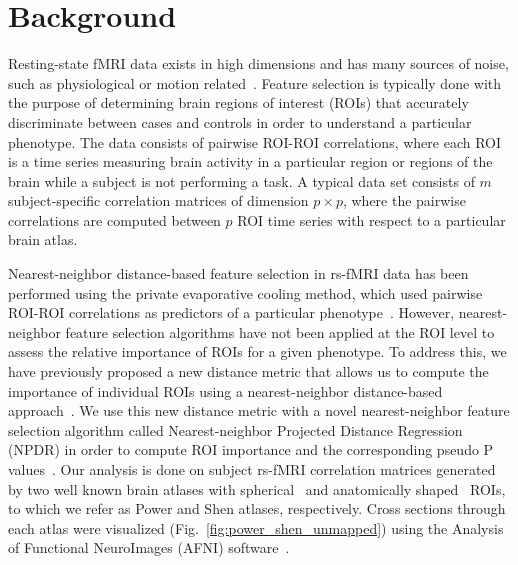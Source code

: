 \documentclass[10pt,letterpaper]{article}\usepackage[]{graphicx}\usepackage[]{color}
\begin{document}
\section{Background}
Resting-state fMRI data exists in high dimensions and has many sources of noise, such as physiological or motion related~\cite{caballero2017}. Feature selection is typically done with the purpose of determining brain regions of interest (ROIs) that accurately discriminate between cases and controls in order to understand a particular phenotype. The data consists of pairwise ROI-ROI correlations, where each ROI is a time series measuring brain activity in a particular region or regions of the brain while a subject is not performing a task. A typical data set consists of $m$ subject-specific correlation matrices of dimension $p \times p$, where the pairwise correlations are computed between $p$ ROI time series with respect to a particular brain atlas. 

Nearest-neighbor distance-based feature selection in rs-fMRI data has been performed using the private evaporative cooling method, which used pairwise ROI-ROI correlations as predictors of a particular phenotype~\cite{le17}. However, nearest-neighbor feature selection algorithms have not been applied at the ROI level to assess the relative importance of ROIs for a given phenotype. To address this, we have previously proposed a new distance metric that allows us to compute the importance of individual ROIs using a nearest-neighbor distance-based approach~\cite{dawkins2019}. We use this new distance metric with a novel nearest-neighbor feature selection algorithm called Nearest-neighbor Projected Distance Regression (NPDR) in order to compute ROI importance and the corresponding pseudo P values~\cite{npdr}. Our analysis is done on subject rs-fMRI correlation matrices generated by two well known brain atlases with spherical~\cite{power2011} and anatomically shaped~\cite{shen2013} ROIs, to which we refer as Power and Shen atlases, respectively. Cross sections through each atlas were visualized (Fig.~\ref{fig:power_shen_unmapped}) using the Analysis of Functional NeuroImages (AFNI) software~\cite{cox1996}.

\vspace{0.25cm}
\end{document}
